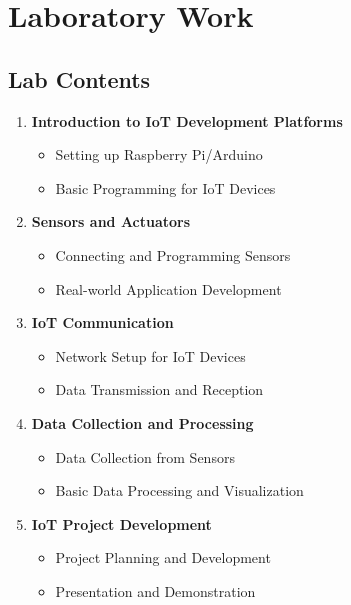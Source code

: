 
\section{Laboratory Work}

\subsection{Lab Contents}
\begin{enumerate}
    \item \textbf{Introduction to IoT Development Platforms} %
    \begin{itemize}
        \item Setting up Raspberry Pi/Arduino
        \item Basic Programming for IoT Devices
    \end{itemize}
    \item \textbf{Sensors and Actuators} %
    \begin{itemize}
        \item Connecting and Programming Sensors
        \item Real-world Application Development
    \end{itemize}
    \item \textbf{IoT Communication} %
    \begin{itemize}
        \item Network Setup for IoT Devices
        \item Data Transmission and Reception
    \end{itemize}
    \item \textbf{Data Collection and Processing} %
    \begin{itemize}
        \item Data Collection from Sensors
        \item Basic Data Processing and Visualization
    \end{itemize}
    \item \textbf{IoT Project Development} %
    \begin{itemize}
        \item Project Planning and Development
        \item Presentation and Demonstration
    \end{itemize}
\end{enumerate}
